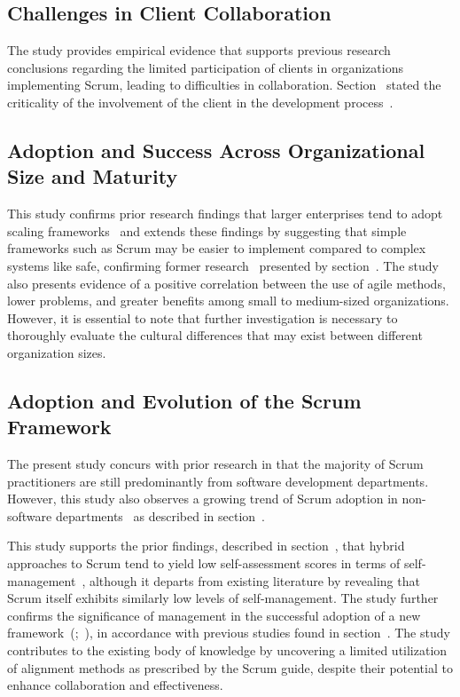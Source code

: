 \subsection*{Challenges in Client Collaboration}\label{subsec:ChallengesinClientCollaboration}
The study provides empirical evidence that supports previous research conclusions regarding the limited participation of \glspl{client} in organizations implementing Scrum, leading to difficulties in collaboration. Section~ stated the criticality of the involvement of the \gls{client} in the development process~\cite[p.~5]{Coyle2009Acs}.

\subsection*{Adoption and Success Across Organizational Size and Maturity}\label{subsec:AdoptionSuccessOrganizationalSize}
This study confirms prior research findings that larger enterprises tend to adopt scaling \glspl{framework}~\cite[p.~50]{Moreira2013AtA} and extends these findings by suggesting that simple \glspl{framework} such as Scrum may be easier to implement compared to complex systems like \ac{safe}, confirming former research~\cite[p.~119]{Gall1986SHs} presented by section~. The study also presents evidence of a positive correlation between the use of \gls{agile} \glspl{method}, lower problems, and greater benefits among small to medium-sized organizations. However, it is essential to note that further investigation is necessary to thoroughly evaluate the cultural differences that may exist between different organization sizes.

\subsection*{Adoption and Evolution of the Scrum Framework}\label{subsec:AdoptionEvolutionScrum}
The present study concurs with prior research in that the majority of Scrum practitioners are still predominantly from software development departments. However, this study also observes a growing trend of Scrum \gls{adoption} in non-software departments~\cite[Revision 2010--2013]{Schwaber2020SGR} as described in section~.

This study supports the prior findings, described in section~, that hybrid approaches to Scrum tend to yield low self-assessment scores in terms of self-management~\cite[p.~24]{Koning2019AT}, although it departs from existing literature by revealing that Scrum itself exhibits similarly low levels of self-management. The study further confirms the significance of management in the successful \gls{adoption} of a new \gls{framework}~(;~), in accordance with previous studies found in section~. The study contributes to the existing body of knowledge by uncovering a limited utilization of alignment \glspl{method} as prescribed by the Scrum guide, despite their potential to enhance collaboration and effectiveness.

